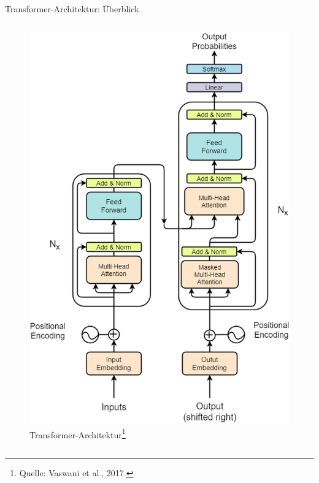 \documentclass[aspectratio=1610, xcolor=dvipsnames, 9pt]{beamer}
\begin{document}
\begin{frame}{Transformer-Architektur: Überblick}
\begin{columns}
\begin{column}{0.3\textwidth}
\begin{figure}
        \includegraphics[width=0.9\columnwidth]{images/Transformer-architecture-figure-sourced-from-original-paper-26.png}
        \caption{Transformer-Architektur\footnote{Quelle: Vaswani et al., 2017.}}
      \end{figure}
    \end{column}
  \end{columns}
\end{frame}
\end{document}
